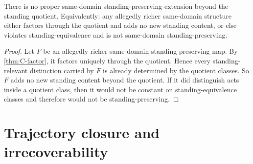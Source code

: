 \begin{theorem}
\label{thm:C-no-proper-extension}
There is no proper same-domain standing-preserving extension beyond the standing quotient. Equivalently: any allegedly richer same-domain structure either factors through the quotient and adds no new standing content, or else violates standing-equivalence and is not same-domain standing-preserving.
\end{theorem}

\begin{proof}
Let $F$ be an allegedly richer same-domain standing-preserving map. By \cref{thm:C-factor}, it factors uniquely through the quotient. Hence every standing-relevant distinction carried by $F$ is already determined by the quotient classes. So $F$ adds no new standing content beyond the quotient. If it did distinguish acts inside a quotient class, then it would not be constant on standing-equivalence classes and therefore would not be standing-preserving.
\end{proof}

\section{Trajectory closure and irrecoverability}
